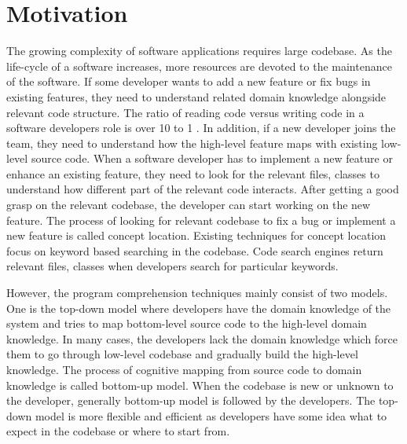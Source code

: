 \section{Motivation}
 The growing complexity of software applications requires large codebase. As the life-cycle of a software increases, more resources are devoted to the maintenance of the software. If some developer wants to add a new feature or fix bugs in existing features, they need to understand related domain knowledge alongside relevant code structure. The ratio of reading code versus writing code in a software developers role is over 10 to 1 \cite{martin2008clean}. In addition, if a new developer joins the team, they need to understand how the high-level feature maps with existing low-level source code. When a software developer has to implement a new feature or enhance an existing feature, they need to look for the relevant files, classes to understand how different part of the relevant code interacts. After getting a good grasp on the relevant codebase, the developer can start working on the new feature. The process of looking for relevant codebase to fix a bug or implement a new feature is called concept location. Existing techniques for concept location focus on keyword based searching in the codebase. Code search engines return relevant files, classes when developers search for particular keywords. 
 
 However, the program comprehension techniques mainly consist of two models. One is the top-down model where developers have the domain knowledge of the system and tries to map bottom-level source code to the high-level domain knowledge. In many cases, the developers lack the domain knowledge which force them to go through low-level codebase and gradually build the high-level knowledge. The process of cognitive mapping from source code to domain knowledge is called bottom-up model. When the codebase is new or unknown to the developer, generally bottom-up model is followed by the developers. The top-down model is more flexible and efficient as developers have some idea what to expect in the codebase or where to start from. 
 

